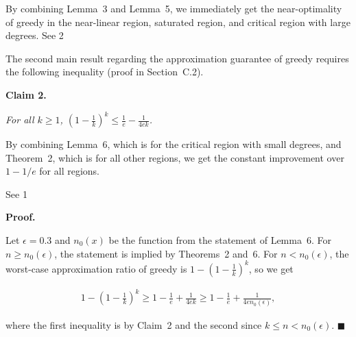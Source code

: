 By combining Lemma 3 and Lemma 5, we immediately get the near-optimality of greedy in the near-linear region, saturated region, and critical region with large degrees.
See 2\par




The second main result regarding the approximation guarantee of greedy requires the following inequality (proof in Section C.2).\par





\par\medskip\noindent\textbf{\textbf{Claim 2}\textbf{.}}\par



\emph{For all $k\geq 1$, $\left(1-\frac{1}{k}\right)^{k}\leq\frac{1}{e}-\frac{1}{4ek}$.}\par






By combining Lemma 6, which is for the critical region with small degrees, and Theorem 2, which is for all other regions, we get the constant improvement over $1-1/e$ for all regions.\par




See 1\par




\par\medskip\noindent\textbf{Proof.}\par



Let $\epsilon=0.3$ and $n_{0}(x)$ be the function from the statement of Lemma 6.
For $n\geq n_{0}(\epsilon)$, the statement is implied by Theorems 2 and 6.
For $n<n_{0}(\epsilon)$, the worst-case approximation ratio of greedy is $1-\left(1-\frac{1}{k}\right)^{k}$, so we get\par


\[\begin{gathered}
\displaystyle 1-\left(1-\frac{1}{k}\right)^{k}\geq 1-\frac{1}{e}+\frac{1}{4ek}\geq 1-\frac{1}{e}+\frac{1}{4en_{0}(\epsilon)},
\end{gathered}\]


where the first inequality is by Claim 2 and the second since $k\leq n<n_{0}(\epsilon)$.
\ensuremath{\blacksquare}\par







